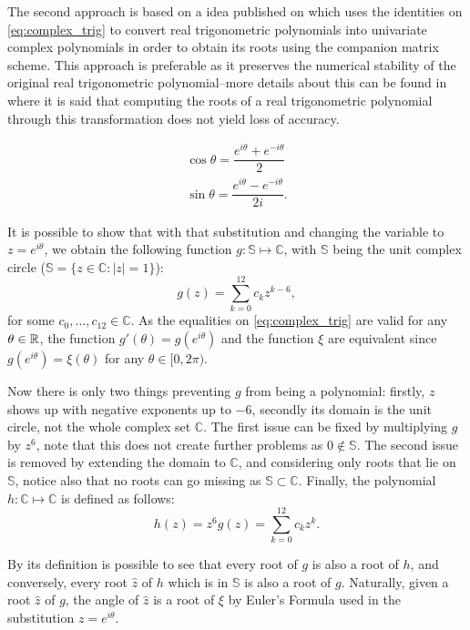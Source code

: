 The second approach is based on a idea published on  which uses the identities on \autoref{eq:complex_trig} to convert real trigonometric polynomials into univariate complex polynomials in order to obtain its roots using the companion matrix scheme. This approach is preferable as it preserves the numerical stability of the original real trigonometric polynomial--more details about this can be found in  where it is said that computing the roots of a real trigonometric polynomial through this transformation does not yield loss of accuracy.

\begin{align}\label{eq:complex_trig}
\cos{\theta} = \dfrac{e^{i\theta} + e^{-i\theta}}{2}\\
\sin{\theta} = \dfrac{e^{i\theta} - e^{-i\theta}}{2i}.
\end{align}

It is possible to show that with that substitution and changing the variable to $z=e^{i\theta}$, we obtain the following function $g : \mathbb{S} \mapsto \mathbb{C}$, with $\mathbb{S}$ being the unit complex circle ($\mathbb{S} = \{z \in \mathbb{C} : |z|=1\}$):
\begin{equation}
g(z)=\sum_{k=0}^{12} c_k z^{k-6},
\end{equation}
for some $c_0, \dots, c_{12} \in \mathbb{C}$. As the equalities on \autoref{eq:complex_trig} are valid for any $\theta \in \mathbb{R}$, the function $g'(\theta)=g(e^{i\theta})$ and the function $\xi$ are equivalent since $g(e^{i\theta}) = \xi(\theta)$ for any $\theta \in [0, 2\pi)$. 

Now there is only two things preventing $g$ from being a polynomial: firstly, $z$ shows up with negative exponents up to $-6$, secondly its domain is the unit circle, not the whole complex set $\mathbb{C}$. The first issue can be fixed by multiplying $g$ by $z^6$, note that this does not create further problems as $0\not\in \mathbb{S}$. The second issue is removed by extending the domain to $\mathbb{C}$, and considering only roots that lie on $\mathbb{S}$, notice also that no roots can go missing as $\mathbb{S} \subset \mathbb{C}$. Finally, the polynomial $h : \mathbb{C} \mapsto \mathbb{C}$ is defined as follows:
\begin{equation}
h(z) = z^6 g(z) = \sum_{k=0}^{12} c_k z^k.
\end{equation}

By its definition is possible to see that every root of $g$ is also a root of $h$, and conversely, every root $\hat{z}$ of $h$ which is in $\mathbb{S}$ is also a root of $g$. Naturally, given a root $\hat{z}$ of $g$, the angle of $\hat{z}$ is a root of $\xi$ by Euler's Formula used in the substitution $z=e^{i\theta}$.

